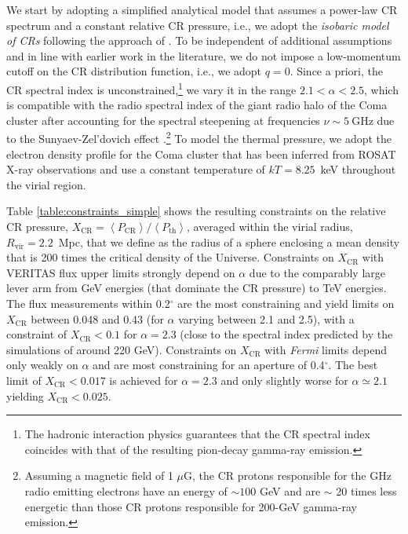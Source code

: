 \documentclass[12pt,manuscript]{aastex}
\newcommand{\expval}[1]{\left\langle #1 \right\rangle}
\newcommand{\rmn}{\mathrm}
\newcommand{\CR}{\mathrm{CR}}
\begin{document}
We start by adopting a simplified analytical model that assumes a power-law CR spectrum and a
constant relative CR pressure, i.e., we adopt the {\em isobaric model of CRs} following the approach
of \citet{article:PfrommerEnsslin:2004b}. To be independent of additional assumptions and in line
with earlier work in the literature, we do not impose a low-momentum cutoff on the CR distribution
function, i.e., we adopt $q=0$. Since a priori, the CR spectral index is unconstrained,\footnote{The
  hadronic interaction physics guarantees that the CR spectral index coincides with that of the
  resulting pion-decay gamma-ray emission.} we vary it in the range $2.1<\alpha<2.5$, which is
compatible with the radio spectral index of the giant radio halo of the Coma cluster after
accounting for the spectral steepening at frequencies $\nu\sim5~\rmn{GHz}$ due to the
Sunyaev-Zel'dovich effect \citep{article:Ensslin:2002,
  article:PfrommerEnsslin:2004b}.\footnote{Assuming a magnetic field of 1 $\mu$G, the CR protons
  responsible for the GHz radio emitting electrons have an energy of $\sim100$ GeV and are $\sim$ 20
  times less energetic than those CR protons responsible for 200-GeV gamma-ray emission.} To model
the thermal pressure, we adopt the electron density profile for the Coma cluster that has been
inferred from ROSAT X-ray observations \citep{article:BrielHenryBohringer:1992} and use a constant
temperature of $kT= 8.25$~keV throughout the virial region.

Table \ref{table:constraints_simple} shows the resulting constraints on the relative CR pressure,
$X_{\CR} = \expval{P_{\CR}}/\expval{P_\rmn{th}}$, averaged within the virial radius,
$R_\rmn{vir}=2.2$~Mpc, that we define as the radius of a sphere enclosing a mean density that is 200
times the critical density of the Universe. Constraints on $X_\CR$ with VERITAS flux upper limits
strongly depend on $\alpha$ due to the comparably large lever arm from GeV energies (that dominate
the CR pressure) to TeV energies. The flux measurements within 0.2$^{\circ}$ are the most
constraining and yield limits on $X_\CR$ between 0.048 and 0.43 (for $\alpha$ varying between 2.1
and 2.5), with a constraint of $X_\CR<0.1$ for $\alpha=2.3$ (close to the spectral index predicted
by the simulations of \citet{article:PinzkePfrommer:2010} around 220 GeV).  Constraints on $X_\CR$
with {\em Fermi} limits depend only weakly on $\alpha$ and are most constraining for an aperture of
0.4$^{\circ}$.  The best limit of $X_\CR< 0.017$ is achieved for $\alpha=2.3$ and only slightly
worse for $\alpha\simeq 2.1$ yielding $X_\CR<0.025$.
\end{document}
